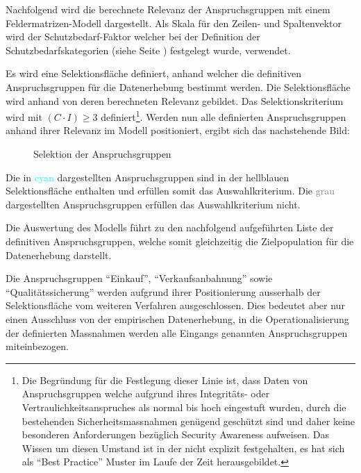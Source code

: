 \documentclass[../../main.tex]{subfiles}
\begin{document}
\begin{sloppypar}
Nachfolgend wird die berechnete Relevanz der Anspruchsgruppen mit einem Feldermatrizen-Modell dargestellt. Als Skala für den Zeilen- und Spaltenvektor wird der Schutzbedarf-Faktor welcher bei der Definition der Schutzbedarfskategorien (siehe Seite \pageref{Schutzbedarfskategorien}) festgelegt wurde, verwendet.

Es wird eine Selektionsfläche definiert, anhand welcher die definitiven Anspruchsgruppen für die Datenerhebung bestimmt werden. Die Selektionsfläche wird anhand von deren berechneten Relevanz gebildet. Das Selektionskriterium wird mit $(C \cdot I) \geq 3$ definiert\footnote{Die Begründung für die Festlegung dieser Linie ist, dass Daten von Anspruchsgruppen welche aufgrund ihres Integritäts- oder Vertraulichkeitsanspruches als normal bis hoch eingestuft wurden, durch die bestehenden Sicherheitsmassnahmen genügend geschützt sind und daher keine besonderen Anforderungen bezüglich Security Awareness aufweisen. Das Wissen um diesen Umstand ist in der \companyshort nicht explizit festgehalten, es hat sich als "`Best Practice"' Muster im Laufe der Zeit herausgebildet.}. Werden nun alle definierten Anspruchsgruppen anhand ihrer Relevanz im Modell positioniert, ergibt sich das nachstehende Bild:
\end{sloppypar}

\begin{figure}[H]
    
    \caption{Selektion der Anspruchsgruppen}
    \label{fig:raster2}
\end{figure}

\begin{sloppypar}
Die in \textcolor{cyan}{cyan} dargestellten Anspruchsgruppen sind in der \textcolor{mylightblue}{hellblauen} Selektionsfläche enthalten und erfüllen somit das Auswahlkriterium. Die \textcolor{gray}{grau} dargestellten Anspruchsgruppen erfüllen das Auswahlkriterium nicht.

Die Auswertung des Modells führt zu den nachfolgend aufgeführten Liste der definitiven Anspruchsgruppen, welche somit gleichzeitig die Zielpopulation für die Datenerhebung darstellt.

Die Anspruchsgruppen "`Einkauf"', "`Verkaufsanbahnung"' sowie "`Qualitätssicherung"' werden aufgrund ihrer Positionierung ausserhalb der Selektionsfläche vom weiteren Verfahren ausgeschlossen. Dies bedeutet aber nur einen Ausschluss von der empirischen Datenerhebung, in die Operationalisierung der definierten Massnahmen werden alle Eingangs genannten Anspruchsgruppen miteinbezogen.
\end{sloppypar}
\end{document}
